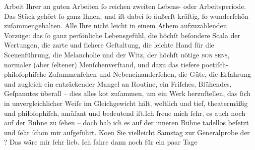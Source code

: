 \begin{ledgroupsized}[t]{13cm}
               Arbeit Ihrer an guten Arbeiten ſo reichen zweiten Lebens- oder Arbeitsperiode.\pend
           \pstart
           Das Stück gehört ſo ganz Ihnen, und iſt dabei ſo äußerſt kräftig, ſo wunderſchön
               zuſammengehalten. Alle Ihre nicht leicht in einem Athem aufzuzählenden Vorzüge: das
               ſo ganz perſönliche Lebensgefühl, die höchſt beſondere Scala der Wertungen, {\pb}die zarte und ſichere Geſtaltung,
               die leichte Hand für die Scenenführung, die Melancholie und der Witz, der höchſt
               nötige \textsc{bon sens}, normaler (aber ſeltener) Menſchenverſtand,
               und dazu das tiefere poetiſch-philoſophiſche Zuſammenſehen und Nebeneinanderſehen,
               die Güte, die Erfahrung und zugleich ein entzückender Mangel an Routine, ein
               Friſches, Blühendes, Geſpanntes überall – dies alles ko{\geminationm}t zuſammen, um ein {\pb}Werk
               herzuſtellen, das ſich in unvergleichlicher Weiſe im Gleichgewicht hält, weltlich und
               tief, theatermäßig und philoſophiſch, amüſant und bedeutend iſt.\hspace*{1.5em}Ich freue mich ſehr, es auch noch auf der Bühne zu ſehen – doch hab
               ich es auf der inneren Bühne tadellos beſetzt und ſehr ſchön mir aufgeführt.\pend
           \pstart
           Ko{\geminationm}en Sie vielleicht Samstag zur
               Generalprobe der \label{K_L01968_2v}\label{K_L01968_2h}? Das wäre mir ſehr lieb.
               Ich fahre dann noch für ein paar Tage \label{K_L01968_3v}
\end{ledgroupsized}
